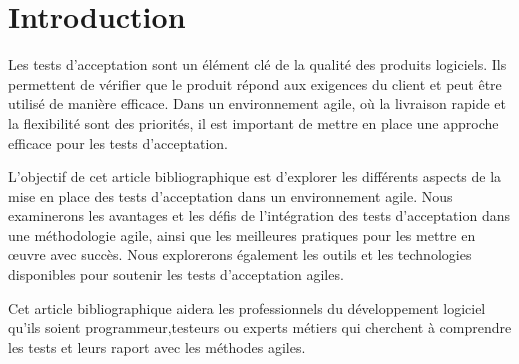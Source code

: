 

\chapter{Introduction}

\label{chap:intro}

Les tests d'acceptation sont un élément clé de la qualité des produits logiciels. Ils permettent de vérifier que le produit répond aux exigences du client et peut être utilisé de manière efficace. Dans un environnement agile, où la livraison rapide et la flexibilité sont des priorités, il est important de mettre en place une approche efficace pour les tests d'acceptation.

L'objectif de cet article bibliographique est d'explorer les différents aspects de la mise en place des tests d'acceptation dans un environnement agile. Nous examinerons les avantages et les défis de l'intégration des tests d'acceptation dans une méthodologie agile, ainsi que les meilleures pratiques pour les mettre en œuvre avec succès. Nous explorerons également les outils et les technologies disponibles pour soutenir les tests d'acceptation agiles.

Cet article bibliographique aidera les professionnels du développement logiciel qu'ils soient programmeur,testeurs ou experts métiers qui cherchent à comprendre les tests et leurs raport avec les méthodes agiles.